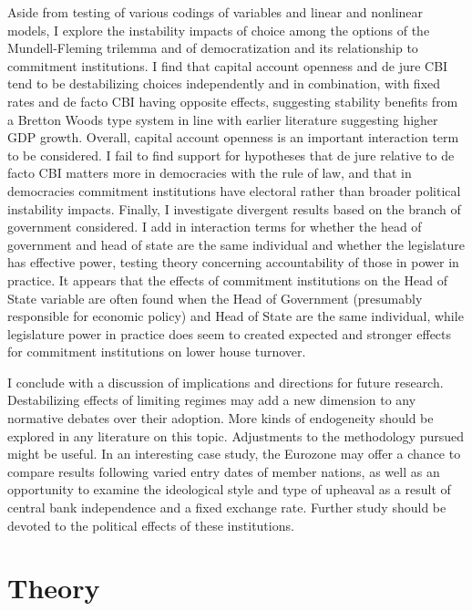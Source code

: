 \documentclass{article}
\begin{document}
    Aside from testing of various codings of variables and linear and nonlinear models, I explore the instability impacts of choice among the options of the Mundell-Fleming trilemma and of democratization and its relationship to commitment institutions. I find that capital account openness and de jure CBI tend to be destabilizing choices independently and in combination, with fixed rates and de facto CBI having opposite effects, suggesting stability benefits from a Bretton Woods type system in line with earlier literature suggesting higher GDP growth. Overall, capital account openness is an important interaction term to be considered. I fail to find support for hypotheses that de jure relative to de facto CBI matters more in democracies with the rule of law, and that in democracies commitment institutions have electoral rather than broader political instability impacts. Finally, I investigate divergent results based on the branch of government considered. I add in interaction terms for whether the head of government and head of state are the same individual and whether the legislature has effective power, testing theory concerning accountability of those in power in practice. It appears that the effects of commitment institutions on the Head of State variable are often found when the Head of Government (presumably responsible for economic policy) and Head of State are the same individual, while legislature power in practice does seem to created expected and stronger effects for commitment institutions on lower house turnover.

    I conclude with a discussion of implications and directions for future research. Destabilizing effects of limiting regimes may add a new dimension to any normative debates over their adoption. More kinds of endogeneity should be explored in any literature on this topic. Adjustments to the methodology pursued might be useful. In an interesting case study, the Eurozone may offer a chance to compare results following varied entry dates of member nations, as well as an opportunity to examine the ideological style and type of upheaval as a result of central bank independence and a fixed exchange rate. Further study should be devoted to the political effects of these institutions.
    
    \section*{Theory}
\end{document}
